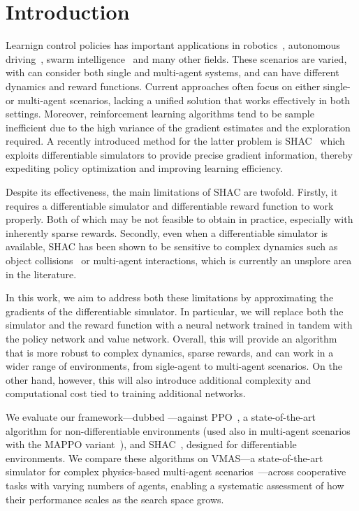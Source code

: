 \section{Introduction}

Learnign control policies has important applications in robotics~\cite{Singh22}, autonomous driving~\cite{Elallid22}, swarm intelligence~\cite{Tang21} and many other fields. 
These scenarios are varied, with can consider both single and multi-agent systems, and can have different dynamics and reward functions.
Current approaches often focus on either single- or multi-agent scenarios, lacking a unified solution that works effectively in both settings.
Moreover, reinforcement learning algorithms tend to be sample inefficient due to the high variance of the gradient estimates and the exploration required.
A recently introduced method for the latter problem is SHAC~\cite{Xu22} which exploits differentiable simulators to provide precise gradient information, thereby expediting policy optimization and improving learning efficiency.

Despite its effectiveness, the main limitations of SHAC are twofold. Firstly, it requires a differentiable simulator and differentiable reward function to work properly. Both of which may be not feasible to obtain in practice, especially with inherently sparse rewards. Secondly, even when a differentiable simulator is available, SHAC has been shown to be sensitive to complex dynamics such as object collisions~\cite{Georgiev24} or multi-agent interactions, which is currently an unsplore area in the literature.

In this work, we aim to address both these limitations by approximating the gradients of the differentiable simulator. In particular, we will replace both the simulator and the reward function with a neural network trained in tandem with the policy network and value network. Overall, this will provide an algorithm that is more robust to complex dynamics, sparse rewards, and can work in a wider range of environments, from sigle-agent to multi-agent scenarios.
On the other hand, however, this will also introduce additional complexity and computational cost tied to training additional networks.

We evaluate our framework---dubbed \fname{}---against PPO~\cite{Schulman17}, a state-of-the-art algorithm for non-differentiable environments (used also in multi-agent scenarios with the MAPPO variant~\cite{DBLP:conf/nips/YuVVGWBW22}), and SHAC~\cite{Xu22}, designed for differentiable environments. 
We compare these algorithms on VMAS---a state-of-the-art simulator for complex physics-based multi-agent scenarios~\cite{DBLP:conf/dars/BettiniKBP22}---across cooperative tasks with varying numbers of agents, enabling a systematic assessment of how their performance scales as the search space grows.

